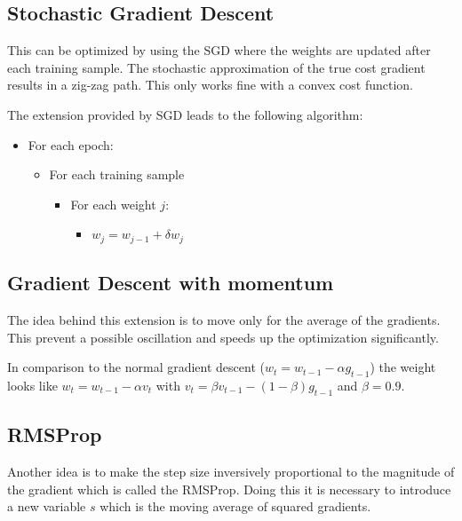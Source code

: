 \subsection{Stochastic Gradient Descent}

This can be optimized by using the \ac{SGD} where the weights are updated after each training sample.
The stochastic approximation of the true cost gradient results in a zig-zag path.
This only works fine with a convex cost function.

The extension provided by \ac{SGD} leads to the following algorithm:

\begin{itemize}
	\item For each epoch:
	\begin{itemize}
        \item{For each training sample}
            \begin{itemize}
            \item For each weight $j$:
            \begin{itemize}
                \item $w_j = w_{j-1} + \delta{w_j}$
            \end{itemize}
        \end{itemize}
	\end{itemize}
\end{itemize}

\subsection{Gradient Descent with momentum}

The idea behind this extension is to move only for the average of the gradients.
This prevent a possible oscillation and speeds up the optimization significantly.

In comparison to the normal gradient descent ($w_t = w_{t-1} - \alpha g_{t-1}$) the weight looks like $w_t = w_{t-1} - \alpha v_t$ with $v_t = \beta v_{t-1} - (1 -\beta)g_{t-1}$ and $\beta = 0.9$.

\subsection{RMSProp}

Another idea is to make the step size inversively proportional to the magnitude of the gradient which is called the \ac{RMSProp}.
Doing this it is necessary to introduce a new variable $s$ which is the moving average of squared gradients.

